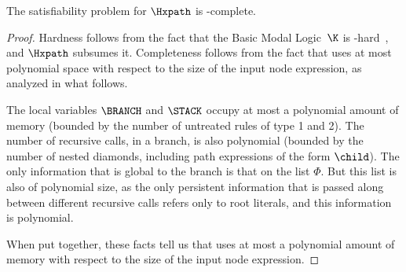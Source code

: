 \begin{thm}
    \label{th:satpspace}
    The satisfiability problem for $\Hxpath$ is \pspace-complete.
\end{thm}
\begin{proof}
    Hardness follows from the fact that the Basic Modal Logic~$\K$ is \pspace-hard~\cite{blackburn2001modal,blackburn06}, and $\Hxpath$ subsumes it. 
    Completeness follows from the fact that  uses at most polynomial space with respect to the size of the input node expression, as analyzed in what follows. 

    The local variables $\BRANCH$ and $\STACK$ occupy at most a polynomial amount of memory (bounded by the number of untreated rules of type 1 and 2).
    The number of recursive calls, in a branch, is also polynomial (bounded by the number of nested diamonds, including path expressions of the form $\child$). 
    The only information that is global to the branch is that on the list $\Phi$.
    But this list is also of polynomial size, as the only persistent information that is passed along between different recursive calls refers only to root literals, and this information is polynomial.

    When put together, these facts tell us that  uses at most a polynomial amount of memory with respect to the size of the input node expression.
\end{proof}

